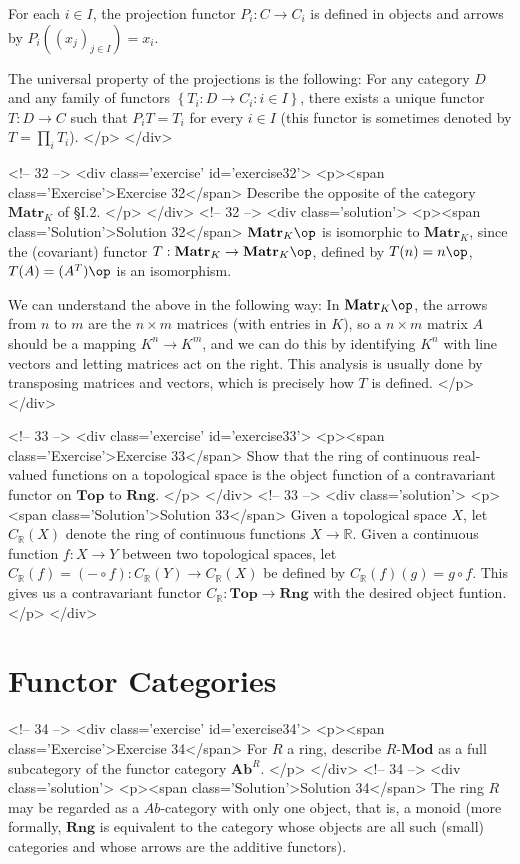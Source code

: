 For each $i\in I$, the projection functor $P_i:C\to C_i$ is defined in objects and arrows by $P_i((x_j)_{j\in I})=x_i$.

The universal property of the projections is the following: For any category $D$ and any family of functors $\left\{T_i:D\to C_i:i\in I\right\}$, there exists a unique functor $T:D\to C$ such that $P_i T=T_i$ for every $i\in I$ (this functor is sometimes denoted by $T=\prod_i T_i$).
</p>
</div>

<!-- 32 -->
<div class='exercise' id='exercise32'>
<p><span class='Exercise'>Exercise 32</span>
Describe the opposite of the category $\mathbf{Matr}_K$ of \S I.2.
</p>
</div>
<!-- 32 -->
<div class='solution'>
<p><span class='Solution'>Solution 32</span>
$\mathbf{Matr}_K\op$ is isomorphic to $\mathbf{Matr}_K$, since the (covariant) functor $T:\mathbf{Matr}_K\to\mathbf{Matr}_K\op$, defined by $T(n)=n\op$, $T(A)=(A^T)\op$ is an isomorphism.

We can understand the above in the following way: In $\mathbf{Matr}_K\op$, the arrows from $n$ to $m$ are the $n\times m$ matrices (with entries in $K$), so a $n\times m$ matrix $A$ should be a mapping $K^n\to K^m$, and we can do this by identifying $K^n$ with line vectors and letting matrices act on the right. This analysis is usually done by transposing matrices and vectors, which is precisely how $T$ is defined.
</p>
</div>

<!-- 33 -->
<div class='exercise' id='exercise33'>
<p><span class='Exercise'>Exercise 33</span>
Show that the ring of continuous real-valued functions on a topological space is the object function of a contravariant functor on $\mathbf{Top}$ to $\mathbf{Rng}$.
</p>
</div>
<!-- 33 -->
<div class='solution'>
<p><span class='Solution'>Solution 33</span>
Given a topological space $X$, let $C_\mathbb{R}(X)$ denote the ring of continuous functions $X\to \mathbb{R}$. Given a continuous function $f:X\to Y$ between two topological spaces, let $C_\mathbb{R}(f)=(-\circ f):C_\mathbb{R}(Y)\to C_\mathbb{R}(X)$ be defined by $C_\mathbb{R}(f)(g)=g\circ f$. This gives us a contravariant functor $C_\mathbb{R}:\mathbf{Top}\to\mathbf{Rng}$ with the desired object funtion.
</p>
</div>

\section{Functor Categories}

<!-- 34 -->
<div class='exercise' id='exercise34'>
<p><span class='Exercise'>Exercise 34</span>
For $R$ a ring, describe $R\text{-}\mathbf{Mod}$ as a full subcategory of the functor category $\mathbf{Ab}^R$.
</p>
</div>
<!-- 34 -->
<div class='solution'>
<p><span class='Solution'>Solution 34</span>
The ring $R$ may be regarded as a $Ab$-category with only one object, that is, a monoid (more formally, $\mathbf{Rng}$ is equivalent to the  category whose objects are all such (small) categories and whose arrows are the additive functors).

